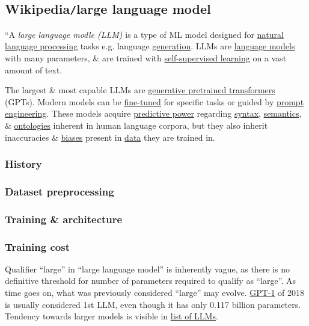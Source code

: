 \documentclass{article}
\begin{document}

\subsection{Wikipedia{\tt/}large language model}
``A {\it large language modle (LLM)} is a type of ML model designed for \href{https://en.wikipedia.org/wiki/Natural_language_processing}{natural language processing} tasks e.g. language \href{https://en.wikipedia.org/wiki/Generative_artificial_intelligence}{generation}. LLMs are \href{https://en.wikipedia.org/wiki/Language_model}{language models} with many parameters, \& are trained with \href{https://en.wikipedia.org/wiki/Self-supervised_learning}{self-supervised learning} on a vast amount of text.

The largest \& most capable LLMs are \href{https://en.wikipedia.org/wiki/Generative_pre-trained_transformer}{generative pretrained transformers} (GPTs). Modern models can be \href{https://en.wikipedia.org/wiki/Fine-tuning_(deep_learning)}{fine-tuned} for specific tasks or guided by \href{https://en.wikipedia.org/wiki/Prompt_engineering}{prompt engineering}. These models acquire \href{https://en.wikipedia.org/wiki/Predictive_learning}{predictive power} regarding \href{https://en.wikipedia.org/wiki/Syntax}{syntax}, \href{https://en.wikipedia.org/wiki/Semantics}{semantics}, \& \href{https://en.wikipedia.org/wiki/Ontology_(information_science)}{ontologies} inherent in human language corpora, but they also inherit inaccuracies \& \href{https://en.wikipedia.org/wiki/Algorithmic_bias}{biases} present in \href{https://en.wikipedia.org/wiki/Training,_validation,_and_test_data_sets}{data} they are trained in.

\subsubsection{History}

\subsubsection{Dataset preprocessing}

\subsubsection{Training \& architecture}

\subsubsection{Training cost}
Qualifier ``large'' in ``large language model'' is inherently vague, as there is no definitive threshold for number of parameters required to qualify as ``large''. As time goes on, what was previously considered ``large'' may evolve. \href{https://en.wikipedia.org/wiki/GPT-1}{GPT-1} of 2018 is usually considered 1st LLM, even though it has only 0.117 billion parameters. Tendency towards larger models is visible in \href{https://en.wikipedia.org/wiki/List_of_large_language_models}{list of LLMs}.
\end{document}
